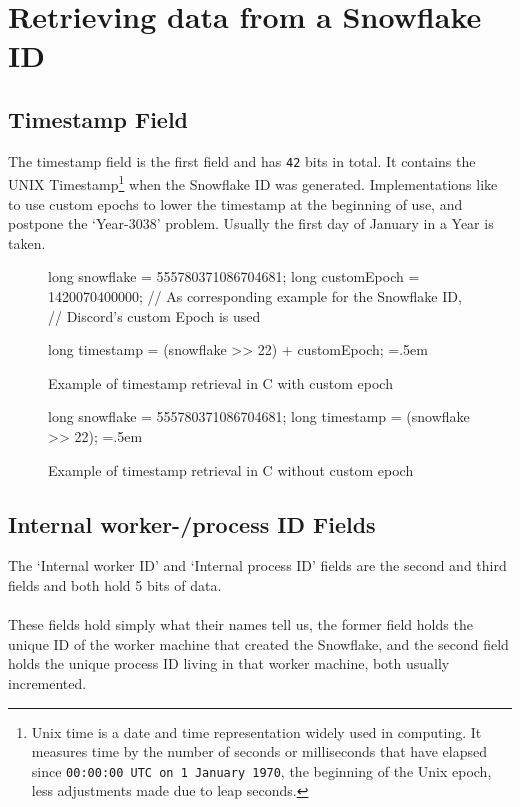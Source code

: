 \documentclass{article}
\newcommand{\code}[1]{\colorbox{cverbbg}{\texttt{#1}}}
\newcommand{\hn}[0]{\hfill \\}
\newenvironment{lcverbatim}
{\SaveVerbatim{cverb}}
{\endSaveVerbatim{}
    \flushleft\fboxrule=0pt\fboxsep=.5em
    \colorbox{cverbbg}{%

        \makebox[\dimexpr\linewidth-2\fboxsep][l]{\BUseVerbatim{cverb}}%
    }
    \endflushleft{}
}
\begin{document}
\pagebreak

\section{Retrieving data from a Snowflake ID}

\subsection{Timestamp Field}
The timestamp field is the first field and has \code{42} bits in total. It
contains the UNIX Timestamp\footnote{Unix time is a date and time
    representation widely used in computing. It measures time by the number of
    seconds or milliseconds that have elapsed since \texttt{00:00:00 UTC on 1
        January 1970}, the beginning of the Unix epoch, less adjustments made
    due to
    leap seconds.} when the Snowflake ID was generated. Implementations like to
use
custom epochs to lower the timestamp at the beginning of use, and postpone the
`Year-3038' problem. Usually the first day of January in a Year is taken.

\begin{figure}[H]
    \begin{lcverbatim}
        long snowflake = 555780371086704681;
        long customEpoch = 1420070400000;
        // As corresponding example for the Snowflake ID,
        // Discord's custom Epoch is used

        long timestamp = (snowflake >> 22) + customEpoch;
    \end{lcverbatim}
    \caption{Example of timestamp retrieval in C with custom
        epoch}\label{fig:r_timestamp_1}
\end{figure}

\begin{figure}[H]
    \begin{lcverbatim}
        long snowflake = 555780371086704681;
        long timestamp = (snowflake >> 22);
    \end{lcverbatim}
    \caption{Example of timestamp retrieval in C without custom
        epoch}\label{fig:r_timestamp_2}
\end{figure}

\subsection{Internal worker-/process ID Fields}
The `Internal worker ID' and `Internal process ID' fields are the second and
third fields and both hold 5 bits of data. \\
\hn{}
These fields hold simply what their names tell us, the former field holds the
unique ID of the worker machine that created the Snowflake, and the second
field holds the unique process ID living in that worker machine, both usually
incremented. \\
\end{document}
